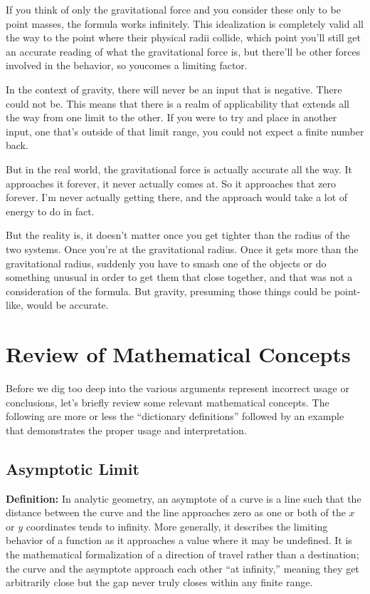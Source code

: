 \documentclass[twoside,twocolumn,9pt]{article}
\begin{document}
If you think of only the gravitational force and you consider these only to be point masses, the formula works infinitely. This idealization is completely valid all the way to the point where their physical radii collide, which point you'll still get an accurate reading of what the gravitational force is, but there'll be other forces involved in the behavior, so youcomes a limiting factor. 

In the context of gravity, there will never be an input that is negative. There could not be. This means that there is a realm of applicability that extends all the way from one limit to the other. If you were to try and place in another input, one that's outside of that limit range, you could not expect a finite number back.     

But in the real world, the gravitational force is actually accurate all the way. It approaches it forever, it never actually comes at. So it approaches that zero forever. I'm never actually getting there, and the approach would take a lot of energy to do in fact.

But the reality is, it doesn't matter once you get tighter than the radius of the two systems. Once you're at the gravitational radius. Once it gets more than the gravitational radius, suddenly you have to smash one of the objects or do something unusual in order to get them that close together, and that was not a consideration of the formula. But gravity, presuming those things could be point-like, would be accurate. 

\section{Review of Mathematical Concepts}
Before we dig too deep into the various arguments represent incorrect usage or conclusions, let's briefly review some relevant mathematical concepts. The following are more or less the ``dictionary definitions'' followed by an example that demonstrates the proper usage and interpretation.

\subsection{Asymptotic Limit}
\textbf{Definition:}
In analytic geometry, an asymptote of a curve is a line such that the distance between the curve and the line approaches zero as one or both of the $x$ or $y$ coordinates tends to infinity. More generally, it describes the limiting behavior of a function as it approaches a value where it may be undefined. It is the mathematical formalization of a direction of travel rather than a destination; the curve and the asymptote approach each other ``at infinity,'' meaning they get arbitrarily close but the gap never truly closes within any finite range.\\
\end{document}

